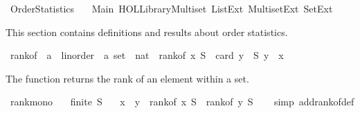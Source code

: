 %
\begin{isabellebody}%
%
%
\isadelimdocument
%
\endisadelimdocument
%
\isatagdocument
%
\isamarkuptrue%
%
\endisatagdocument
{\isafolddocument}%
%
\isadelimdocument
%
\endisadelimdocument
%
\isadelimtheory
%
\endisadelimtheory
%
\isatagtheory
{}\isamarkupfalse%
\ OrderStatistics\isanewline
\ \ \ Main\ {\isachardoublequoteopen}HOL{\isacharminus}{\kern0pt}Library{\isachardot}{\kern0pt}Multiset{\isachardoublequoteclose}\ List{\isacharunderscore}{\kern0pt}Ext\ Multiset{\isacharunderscore}{\kern0pt}Ext\ Set{\isacharunderscore}{\kern0pt}Ext\isanewline
{}%
\endisatagtheory
{\isafoldtheory}%
%
\isadelimtheory
%
\endisadelimtheory
%
\begin{isamarkuptext}%
This section contains definitions and results about order statistics.%
\end{isamarkuptext}\isamarkuptrue%
\isamarkupfalse%
\ rank{\isacharunderscore}{\kern0pt}of\ {\isacharcolon}{\kern0pt}{\isacharcolon}{\kern0pt}\ {\isachardoublequoteopen}{\isacharprime}{\kern0pt}a\ {\isacharcolon}{\kern0pt}{\isacharcolon}{\kern0pt}\ linorder\ {\isasymRightarrow}\ {\isacharprime}{\kern0pt}a\ set\ {\isasymRightarrow}\ nat{\isachardoublequoteclose}\ \ {\isachardoublequoteopen}rank{\isacharunderscore}{\kern0pt}of\ x\ S\ {\isacharequal}{\kern0pt}\ card\ {\isacharbraceleft}{\kern0pt}y\ {\isasymin}\ S{\isachardot}{\kern0pt}\ y\ {\isacharless}{\kern0pt}\ x{\isacharbraceright}{\kern0pt}{\isachardoublequoteclose}%
\begin{isamarkuptext}%
The function  returns the rank of an element within a set.%
\end{isamarkuptext}\isamarkuptrue%
\isamarkupfalse%
\ rank{\isacharunderscore}{\kern0pt}mono{\isacharcolon}{\kern0pt}\isanewline
\ \ \ {\isachardoublequoteopen}finite\ S{\isachardoublequoteclose}\isanewline
\ \ \ {\isachardoublequoteopen}x\ {\isasymle}\ y\ {\isasymLongrightarrow}\ rank{\isacharunderscore}{\kern0pt}of\ x\ S\ {\isasymle}\ rank{\isacharunderscore}{\kern0pt}of\ y\ S{\isachardoublequoteclose}\isanewline
%
\isadelimproof
\ \ %
\endisadelimproof
%
\isatagproof
{}\isamarkupfalse%
\ {\isacharparenleft}{\kern0pt}simp\ add{\isacharcolon}{\kern0pt}rank{\isacharunderscore}{\kern0pt}of{\isacharunderscore}{\kern0pt}def{\isacharparenright}{\kern0pt}\isanewline
\ \ \isamarkupfalse%

\end{isabellebody}
